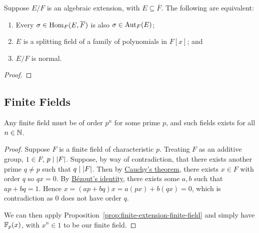 \begin{theorem}\label{thm:normal-extension-equivalence}
    Suppose \(E/F\) is an algebraic extension, with \(E \subseteq \overline{F}\).
    The following are equivalent:
    \begin{enumerate}[label={(\alph*)}, itemsep=0mm]
        \item Every \(\sigma\in\operatorname{Hom}_F(E,\overline{F})\) is also \(\sigma\in\operatorname{Aut}_F(E)\);
        \item \(E\) is a splitting field of a family of polynomials in \(F[x]\); and
        \item \(E/F\) is normal.
    \end{enumerate}
\end{theorem}
\begin{proof}
\end{proof}


\subsection{Finite Fields}

\begin{proposition}\label{prop:existence-finite-fields}
    Any finite field must be of order \(p^n\) for some prime \(p\),
    and such fields exists for all \(n \in \mathbb{N}\).
\end{proposition}
\begin{proof}
    Suppose \(F\) is a finite field of characteristic \(p\).
    Treating \(F\) as an additive group, \(1 \in F\), \(p \mid \abs{F}\).
    Suppose, by way of contradiction,
    that there exists another prime \(q \neq p\) such that \(q \mid \abs{F}\).
    Then by \hyperref[thm:cayley]{Cauchy's theorem},
    there exists \(x \in F\) with order \(q\) so \(qx = 0\).
    By \hyperref[thm:bezout]{B\'ezout's identity},
    there exists some \(a,b\) such that \(ap + bq = 1\).
    Hence \(x = (ap+bq)x = a(px) + b(qx) = 0\),
    which is contradiction as \(0\) does not have order \(q\).

    We can then apply Proposition~\ref{prop:finite-extension-finite-field}
    and simply have \(\mathbb{F}_p(x)\), with \(x^n \in 1\) to be our finite field.
\end{proof}

